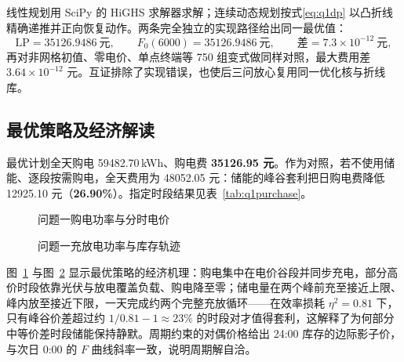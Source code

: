 线性规划用 SciPy\cite{scipy} 的 HiGHS 求解器求解；连续动态规划按式\eqref{eq:q1dp} 以凸折线精确递推并正向恢复动作。两条完全独立的实现路径给出同一最优值：
\[
\text{LP}=35126.9486\ \text{元},\qquad F_0(6000)=35126.9486\ \text{元},\qquad \text{差}=7.3\times10^{-12}\ \text{元},
\]
再对非网格初值、零电价、单点终端等 750 组变式做同样对照，最大费用差 $3.64\times10^{-12}$ 元。互证排除了实现错误，也使后三问放心复用同一优化核与折线库。

\subsection{最优策略及经济解读}
最优计划全天购电 59482.70\,kWh、购电费 \textbf{35126.95 元}。作为对照，若不使用储能、逐段按需购电，全天费用为 48052.05 元：储能的峰谷套利把日购电费降低 12925.10 元（\textbf{26.90\%}）。指定时段结果见表~\ref{tab:q1purchase}。



\begin{figure}[!htbp]\centering
{}
\caption{问题一购电功率与分时电价}\label{fig:fig_f03_q1_day}
\end{figure}


\begin{figure}[!htbp]\centering
{}
\caption{问题一充放电功率与库存轨迹}\label{fig:fig_f14_q1_storage}
\end{figure}

图~\ref{fig:fig_f03_q1_day} 与图~\ref{fig:fig_f14_q1_storage} 显示最优策略的经济机理：购电集中在电价谷段并同步充电，部分高价时段依靠光伏与放电覆盖负载、购电降至零；储电量在两个峰前充至接近上限、峰内放至接近下限，一天完成约两个完整充放循环——在效率损耗 $\eta^2=0.81$ 下，只有峰谷价差超过约 $1/0.81-1\approx23\%$ 的时段对才值得套利，这解释了为何部分中等价差时段储能保持静默。周期约束的对偶价格给出 24:00 库存的边际影子价，与次日 0:00 的 $F$ 曲线斜率一致，说明周期解自洽。
